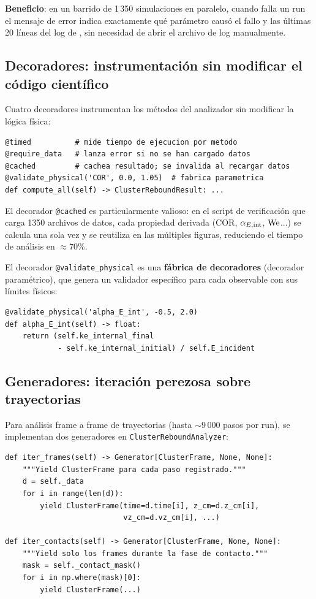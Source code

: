 \textbf{Beneficio}: en un barrido de 1\,350 simulaciones en paralelo, cuando
falla un run el mensaje de error indica exactamente qué parámetro causó el
fallo y las últimas 20 líneas del log de \lammps{}, sin necesidad de abrir
el archivo de log manualmente.

\subsection{Decoradores: instrumentación sin modificar el código científico}
\label{sec:decoradores}

Cuatro decoradores instrumentan los métodos del analizador sin modificar la
lógica física:

\begin{lstlisting}[caption={Decoradores en \texttt{analysis.py}.}]
@timed          # mide tiempo de ejecucion por metodo
@require_data   # lanza error si no se han cargado datos
@cached         # cachea resultado; se invalida al recargar datos
@validate_physical('COR', 0.0, 1.05)  # fabrica parametrica
def compute_all(self) -> ClusterReboundResult: ...
\end{lstlisting}

El decorador \verb|@cached| es particularmente valioso: en el script de
verificación que carga \num{1350} archivos de datos, cada propiedad derivada
(COR, $\alpha_{E,\mathrm{int}}$, $\mathrm{We}$...) se calcula una sola vez y se reutiliza en las
múltiples figuras, reduciendo el tiempo de análisis en $\approx$70\%.

El decorador \verb|@validate_physical| es una \textbf{fábrica de decoradores}
(decorador paramétrico), que genera un validador específico para cada
observable con sus límites físicos:

\begin{lstlisting}
@validate_physical('alpha_E_int', -0.5, 2.0)
def alpha_E_int(self) -> float:
    return (self.ke_internal_final
            - self.ke_internal_initial) / self.E_incident
\end{lstlisting}

\subsection{Generadores: iteración perezosa sobre trayectorias}
\label{sec:generadores}

Para análisis frame a frame de trayectorias (hasta $\sim$9\,000 pasos por run),
se implementan dos generadores en \verb|ClusterReboundAnalyzer|:

\begin{lstlisting}[caption={Generadores de trayectoria.}]
def iter_frames(self) -> Generator[ClusterFrame, None, None]:
    """Yield ClusterFrame para cada paso registrado."""
    d = self._data
    for i in range(len(d)):
        yield ClusterFrame(time=d.time[i], z_cm=d.z_cm[i],
                           vz_cm=d.vz_cm[i], ...)

def iter_contacts(self) -> Generator[ClusterFrame, None, None]:
    """Yield solo los frames durante la fase de contacto."""
    mask = self._contact_mask()
    for i in np.where(mask)[0]:
        yield ClusterFrame(...)
\end{lstlisting}

